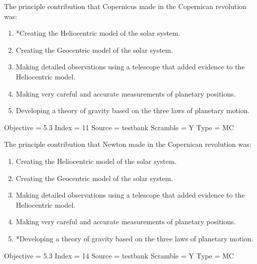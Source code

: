\documentclass[11pt]{article}
\begin{document}
\begin{enumerate}
\begin{minipage}{\textwidth}
\begin{minipage}{\textwidth}
\item The principle contribution that Copernicus made in the Copernican revolution was:
\begin{enumerate} 
\setlength{\itemsep}{1pt} 
\setlength{\parskip}{0pt} 
\setlength{\parsep}{0pt}
\setlength{\multicolsep}{1pt} 
\item *Creating the Heliocentric model of the solar system.
\item Creating the Geocentric model of the solar system.
\item Making detailed observations using a telescope that added evidence to the Heliocentric model.
\item Making very careful and accurate measurements of planetary positions.
\item Developing a theory of gravity based on the three laws of planetary motion.
\end{enumerate} 
Objective = 5.3
Index = 11
Source = testbank
Scramble = Y
Type = MC
\end{minipage}
\end{minipage}
\vskip 0.20in

\begin{minipage}{\textwidth}
\begin{minipage}{\textwidth}
\item The principle contribution that Newton made in the Copernican revolution was:
\begin{enumerate} 
\setlength{\itemsep}{1pt} 
\setlength{\parskip}{0pt} 
\setlength{\parsep}{0pt}
\setlength{\multicolsep}{1pt} 
\item Creating the Heliocentric model of the solar system.
\item Creating the Geocentric model of the solar system.
\item Making detailed observations using a telescope that added evidence to the Heliocentric model.
\item Making very careful and accurate measurements of planetary positions.
\item *Developing a theory of gravity based on the three laws of planetary motion.
\end{enumerate} 
Objective = 5.3
Index = 14
Source = testbank
Scramble = Y
Type = MC
\end{minipage}
\end{minipage}
\vskip 0.20in


\end{enumerate}
\end{document}
